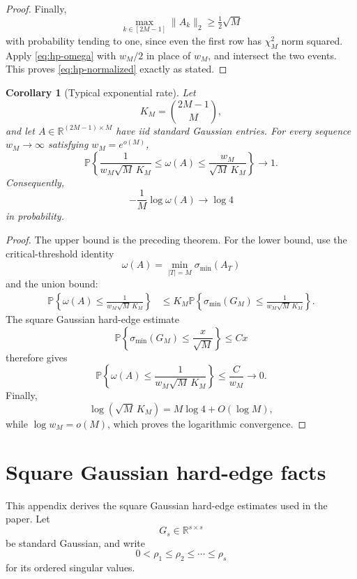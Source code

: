 \documentclass[11pt]{article}
\newtheorem{corollary}{Corollary}
\newcommand{\R}{\mathbb R}
\newcommand{\1}{\mathbf 1}
\begin{document}
\begin{proof}
Finally,
\[
        \max_{k\in[2M-1]}\|A_k\|_2\ge \tfrac12\sqrt M
\]
with probability tending to one, since even the first row has \(\chi^2_M\) norm squared.
Apply \eqref{eq:hp-omega} with \(w_M/2\) in place of \(w_M\), and intersect the two
events. This proves \eqref{eq:hp-normalized} exactly as stated.
\end{proof}

\begin{corollary}[Typical exponential rate]
\label{cor:typical-exponential-rate}
Let
\[
        K_M=\binom{2M-1}{M},
\]
and let \(A\in\mathbb R^{(2M-1)\times M}\) have iid standard Gaussian
entries. For every sequence \(w_M\to\infty\) satisfying
\(w_M=e^{o(M)}\),
\[
        \mathbb P\left\{
        \frac{1}{w_M\sqrt M\,K_M}
        \le \omega(A)
        \le
        \frac{w_M}{\sqrt M\,K_M}
        \right\}
        \longrightarrow 1.
\]
Consequently,
\[
        -\frac{1}{M}\log\omega(A)
        \longrightarrow \log 4
\]
in probability.
\end{corollary}

\begin{proof}
The upper bound is the preceding theorem. For the lower bound, use the
critical-threshold identity
\[
        \omega(A)=\min_{|T|=M}\sigma_{\min}(A_T)
\]
and the union bound:
\[
\begin{aligned}
        \mathbb P\left\{
        \omega(A)\le
        \frac{1}{w_M\sqrt M\,K_M}
        \right\}
        &\le
        K_M
        \mathbb P\left\{
        \sigma_{\min}(G_M)
        \le
        \frac{1}{w_M\sqrt M\,K_M}
        \right\}.
\end{aligned}
\]
The square Gaussian hard-edge estimate
\[
        \mathbb P\left\{
        \sigma_{\min}(G_M)\le \frac{x}{\sqrt M}
        \right\}\le Cx
\]
therefore gives
\[
        \mathbb P\left\{
        \omega(A)\le
        \frac{1}{w_M\sqrt M\,K_M}
        \right\}
        \le \frac{C}{w_M}\longrightarrow0.
\]
Finally,
\[
        \log(\sqrt M\,K_M)=M\log4+O(\log M),
\]
while \(\log w_M=o(M)\), which proves the logarithmic convergence.
\end{proof}

\newpage

\appendix
\section{Square Gaussian hard-edge facts}
\label{app:square-hard-edge}

This appendix derives the square Gaussian hard-edge estimates used in the paper.  Let
\[
        G_s\in\R^{s\times s}
\]
be standard Gaussian, and write
\[
        0<\rho_1\le\rho_2\le\cdots\le\rho_s
\]
for its ordered singular values.
\end{document}
